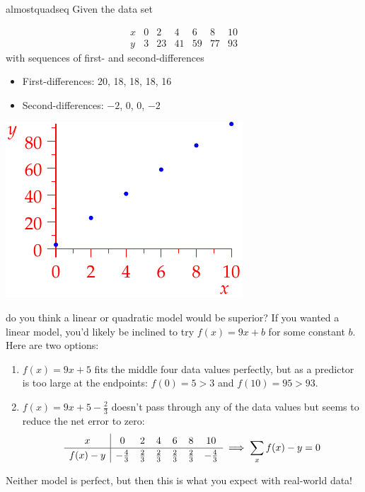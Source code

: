 \begin{example}{}{almostquadseq}
Given the data set\par
\begin{minipage}[t]{0.65\linewidth}\vspace{-10pt}
\[\begin{array}{c|cccccc}
x&0&2&4&6&8&10\\\hline
y&3&23&41&59&77&93
\end{array}\]
with sequences of first- and second-differences
\begin{itemize}
  \item[]First-differences: 20, 18, 18, 18, 16
  \item[]Second-differences: $-2$, 0, 0, $-2$ 
\end{itemize}
\end{minipage}\hfill\begin{minipage}[t]{0.34\linewidth}\vspace{-10pt}
\flushright\includegraphics{seqquadex3}
\end{minipage}\smallbreak
do you think a linear or quadratic model would be superior?\smallbreak
If you wanted a linear model, you'd likely be inclined to try $f(x)=9x+b$ for some constant $b$. Here are two options:
\begin{enumerate}
  \item $f(x)=9x+5$ fits the middle four data values perfectly, but as a predictor is too large at the endpoints: $f(0)=5>3$ and $f(10)=95>93$.
  \item $f(x)=9x+5-\frac 23$ doesn't pass through any of the data values but seems to reduce the net error to zero:
  \[\def\arraystretch{1.2}\begin{array}{c|cccccc}
	x&0&2&4&6&8&10\\\hline
	f(x)-y&-\frac 43&\frac 23&\frac 23&\frac 23&\frac 23&-\frac 43
	\end{array}
	\implies \sum_x f(x)-y=0\]
\end{enumerate}
Neither model is perfect, but then this is what you expect with real-world data!
\end{example}

